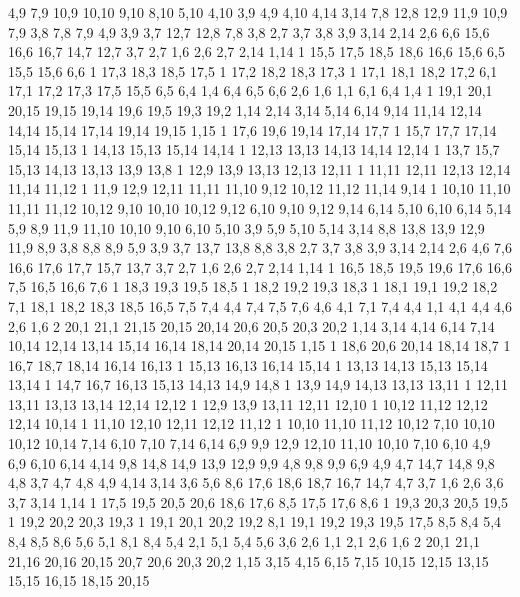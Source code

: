 4,9
7,9
10,9
10,10
9,10
8,10
5,10
4,10
%
3,9
4,9
4,10
4,14
3,14
%
7,8
12,8
12,9
11,9
10,9
7,9
%
3,8
7,8
7,9
4,9
3,9
%
3,7
12,7
12,8
7,8
3,8
%
2,7
3,7
3,8
3,9
3,14
2,14
%
2,6
6,6
15,6
16,6
16,7
14,7
12,7
3,7
2,7
%
1,6
2,6
2,7
2,14
1,14
1%
15,5
17,5
18,5
18,6
16,6
15,6
%
6,5
15,5
15,6
6,6
1%
17,3
18,3
18,5
17,5
1%
17,2
18,2
18,3
17,3
1%
17,1
18,1
18,2
17,2
%
6,1
17,1
17,2
17,3
17,5
15,5
6,5
6,4
%
1,4
6,4
6,5
6,6
2,6
1,6
%
1,1
6,1
6,4
1,4
1%
19,1
20,1
20,15
19,15
19,14
19,6
19,5
19,3
19,2
%
1,14
2,14
3,14
5,14
6,14
9,14
11,14
12,14
14,14
15,14
17,14
19,14
19,15
1,15
1%
17,6
19,6
19,14
17,14
17,7
1%
15,7
17,7
17,14
15,14
15,13
1%
14,13
15,13
15,14
14,14
1%
12,13
13,13
14,13
14,14
12,14
1%
13,7
15,7
15,13
14,13
13,13
13,9
13,8
1%
12,9
13,9
13,13
12,13
12,11
1%
11,11
12,11
12,13
12,14
11,14
11,12
1%
11,9
12,9
12,11
11,11
11,10
%
9,12
10,12
11,12
11,14
9,14
1%
10,10
11,10
11,11
11,12
10,12
%
9,10
10,10
10,12
9,12
%
6,10
9,10
9,12
9,14
6,14
%
5,10
6,10
6,14
5,14
%
5,9
8,9
11,9
11,10
10,10
9,10
6,10
5,10
%
3,9
5,9
5,10
5,14
3,14
%
8,8
13,8
13,9
12,9
11,9
8,9
%
3,8
8,8
8,9
5,9
3,9
%
3,7
13,7
13,8
8,8
3,8
%
2,7
3,7
3,8
3,9
3,14
2,14
%
2,6
4,6
7,6
16,6
17,6
17,7
15,7
13,7
3,7
2,7
%
1,6
2,6
2,7
2,14
1,14
1%
16,5
18,5
19,5
19,6
17,6
16,6
%
7,5
16,5
16,6
7,6
1%
18,3
19,3
19,5
18,5
1%
18,2
19,2
19,3
18,3
1%
18,1
19,1
19,2
18,2
%
7,1
18,1
18,2
18,3
18,5
16,5
7,5
7,4
%
4,4
7,4
7,5
7,6
4,6
%
4,1
7,1
7,4
4,4
%
1,1
4,1
4,4
4,6
2,6
1,6
2%
20,1
21,1
21,15
20,15
20,14
20,6
20,5
20,3
20,2
%
1,14
3,14
4,14
6,14
7,14
10,14
12,14
13,14
15,14
16,14
18,14
20,14
20,15
1,15
1%
18,6
20,6
20,14
18,14
18,7
1%
16,7
18,7
18,14
16,14
16,13
1%
15,13
16,13
16,14
15,14
1%
13,13
14,13
15,13
15,14
13,14
1%
14,7
16,7
16,13
15,13
14,13
14,9
14,8
1%
13,9
14,9
14,13
13,13
13,11
1%
12,11
13,11
13,13
13,14
12,14
12,12
1%
12,9
13,9
13,11
12,11
12,10
1%
10,12
11,12
12,12
12,14
10,14
1%
11,10
12,10
12,11
12,12
11,12
1%
10,10
11,10
11,12
10,12
%
7,10
10,10
10,12
10,14
7,14
%
6,10
7,10
7,14
6,14
%
6,9
9,9
12,9
12,10
11,10
10,10
7,10
6,10
%
4,9
6,9
6,10
6,14
4,14
%
9,8
14,8
14,9
13,9
12,9
9,9
%
4,8
9,8
9,9
6,9
4,9
%
4,7
14,7
14,8
9,8
4,8
%
3,7
4,7
4,8
4,9
4,14
3,14
%
3,6
5,6
8,6
17,6
18,6
18,7
16,7
14,7
4,7
3,7
%
1,6
2,6
3,6
3,7
3,14
1,14
1%
17,5
19,5
20,5
20,6
18,6
17,6
%
8,5
17,5
17,6
8,6
1%
19,3
20,3
20,5
19,5
1%
19,2
20,2
20,3
19,3
1%
19,1
20,1
20,2
19,2
%
8,1
19,1
19,2
19,3
19,5
17,5
8,5
8,4
%
5,4
8,4
8,5
8,6
5,6
%
5,1
8,1
8,4
5,4
%
2,1
5,1
5,4
5,6
3,6
2,6
%
1,1
2,1
2,6
1,6
2%
20,1
21,1
21,16
20,16
20,15
20,7
20,6
20,3
20,2
%
1,15
3,15
4,15
6,15
7,15
10,15
12,15
13,15
15,15
16,15
18,15
20,15
